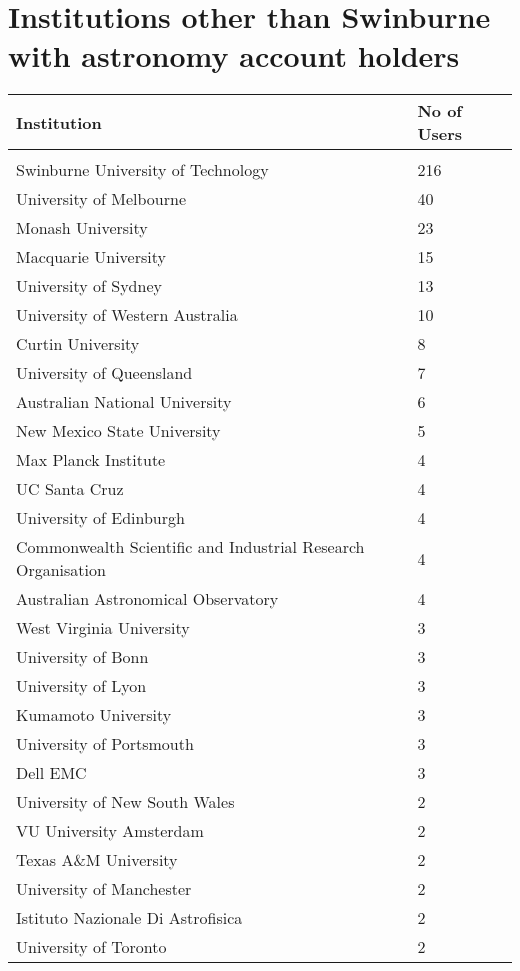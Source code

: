 \documentclass{article}%
\begin{document}
\section{Institutions other than Swinburne with astronomy account holders}%

%
\begin{longtabu}{X[l] X[r]}%
\textbf{Institution}&\textbf{No of Users}\\%
\hline%
&\\%
Swinburne University of Technology&216\\%
\hline%
University of Melbourne&40\\%
\hline%
Monash University&23\\%
\hline%
Macquarie University&15\\%
\hline%
University of Sydney&13\\%
\hline%
University of Western Australia&10\\%
\hline%
Curtin University&8\\%
\hline%
University of Queensland&7\\%
\hline%
Australian National University&6\\%
\hline%
New Mexico State University&5\\%
\hline%
Max Planck Institute&4\\%
\hline%
UC Santa Cruz&4\\%
\hline%
University of Edinburgh&4\\%
\hline%
Commonwealth Scientific and Industrial Research Organisation&4\\%
\hline%
Australian Astronomical Observatory&4\\%
\hline%
West Virginia University&3\\%
\hline%
University of Bonn&3\\%
\hline%
University of Lyon&3\\%
\hline%
Kumamoto University&3\\%
\hline%
University of Portsmouth&3\\%
\hline%
Dell EMC&3\\%
\hline%
University of New South Wales&2\\%
\hline%
VU University Amsterdam&2\\%
\hline%
Texas A\&M University&2\\%
\hline%
University of Manchester&2\\%
\hline%
Istituto Nazionale Di Astrofisica&2\\%
\hline%
University of Toronto&2\\%
\hline%

\end{longtabu}
\end{document}
